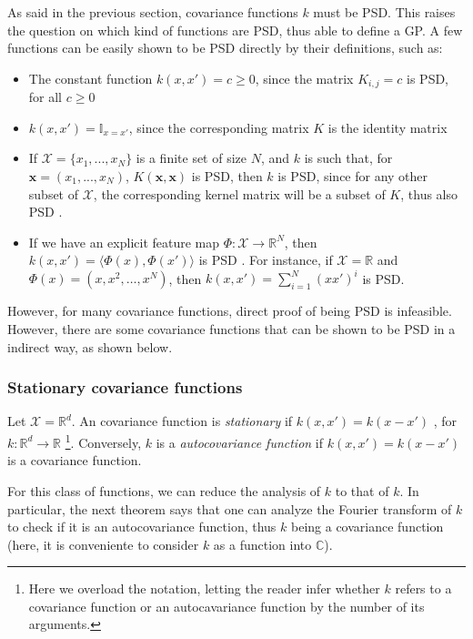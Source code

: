 As said in the previous section, covariance functions $k$ must be PSD. This raises the question on which kind of functions are PSD, thus able to define a GP. A few functions can be easily shown to be PSD directly by their definitions, such as:
\begin{itemize}
	\item The constant function $k(x,x') = c \geq 0$, since the matrix $K_{i,j} = c$ is PSD, for all $c \geq 0$
	\item $k(x,x') = \mathbb{I}_{x = x'}$, since the corresponding matrix $K$ is the identity matrix
	\item If $\mathcal{X} = \{x_1,...,x_N\}$  is a finite set of size $N$, and $k$ is such that, for $\mathbf{x} = (x_1,...,x_N)$, 
	$K(\mathbf{x},\mathbf{x})$ is PSD, then $k$ is PSD, since for any other subset of $\mathcal{X}$, the corresponding kernel matrix will be a subset of $K$, thus also PSD \cite{hogben14}.
	\item If we have an explicit feature map $\Phi : \mathcal{X} \to \mathbb{R}^N$, then $k(x,x') = \langle \Phi(x),\Phi(x') \rangle$ is PSD \cite{Shawe_Taylor_2004}. For instance, if $\mathcal{X} = \mathbb{R}$ and $\Phi(x) = (x,x^2,\ldots,x^N)$, then $k(x,x') = \sum_{i=1}^N (x x')^i$ is PSD.
\end{itemize}
However, for many covariance functions, direct proof of being PSD is infeasible. However, there are some covariance functions that can be shown to be PSD in a indirect way, as shown below.
\subsubsection{Stationary covariance functions}
\begin{Definition}
	Let $\mathcal{X} = \mathbb{R}^d$. An covariance function is \textit{stationary} if $k(x,x') = k(x - x')$ , 
	for $k : \mathbb{R}^d \to \mathbb{R}$ \footnote{Here we overload the notation, letting the reader infer whether $k$ refers to a covariance function or an autocavariance function by the number of its arguments.}. Conversely, $k$ is a \textit{autocovariance function} if $k(x,x') = k(x - x')$ is a covariance function.
\end{Definition}
For this class of functions, we can reduce the analysis of $k$ to that of $k$. In particular, the next theorem says that one can analyze the Fourier transform of $k$ to check if it is an autocovariance function, thus $k$ being a covariance function (here, it is conveniente to consider $k$ as a function into $\mathbb{C}$).

